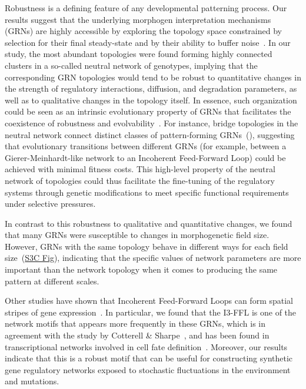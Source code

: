 \documentclass[10pt,letterpaper]{article}
\begin{document}
Robustness is a defining feature of any developmental patterning process.
Our results suggest that the underlying morphogen interpretation
mechanisms (GRNs) are highly accessible by exploring the
topology space constrained by selection for their final steady-state and
by their ability to buffer noise~\cite{lo_robust_2015, exelby_2021}.
In our study, the most abundant topologies were found forming highly
connected clusters in a so-called neutral network of genotypes,
implying that the corresponding GRN topologies would tend to be robust
to quantitative changes in the strength of regulatory interactions, diffusion, and
degradation parameters, as well as to qualitative changes in the topology
itself. In essence, such organization could be seen as an intrinsic evolutionary
property of GRNs that facilitates the coexistence of robustness and
evolvability~\cite{wagner_robustness_2008}. For instance, bridge topologies
in the neutral network connect distinct classes of pattern-forming
GRNs~(), suggesting that evolutionary transitions between
different GRNs (for example, between a Gierer-Meinhardt-like network to an
Incoherent Feed-Forward Loop) could be achieved with minimal fitness
costs. This high-level property of the neutral network of topologies could thus
facilitate the fine-tuning of the regulatory systems through genetic modifications
to meet specific functional requirements under selective pressures.

In contrast to this robustness to
qualitative and quantitative changes, we found that many GRNs were susceptible
to changes in morphogenetic field size. However, GRNs with the same
topology behave in different ways for each field size~(\hyperref[S3_Fig]{S3C Fig}),
indicating that the specific values of network parameters are more important
than the network topology when it comes to producing the same pattern at
different scales.

Other studies have shown that Incoherent Feed-Forward Loops can form
spatial stripes of gene expression~\cite{ishihara_cross_2005}. In particular,
we found that the I3-FFL is one of the network motifs that appears more
frequently in these GRNs, which is in agreement with the study by Cotterell \&
Sharpe~\cite{Cotterell2010}, and has been found in transcriptional networks involved
in cell fate definition~\cite{Li2019}. Moreover, our results indicate that this
is a robust motif that can be useful for constructing synthetic gene
regulatory networks exposed to stochastic fluctuations in the
environment and mutations.
\end{document}

